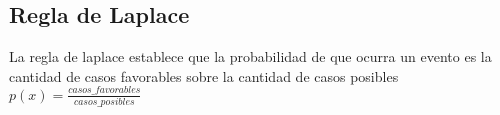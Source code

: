 \subsection{Regla de Laplace}
La regla de laplace establece que la probabilidad de que ocurra un evento es la cantidad de casos favorables sobre la cantidad de casos posibles\\
$p(x)=\frac{casos\_favorables}{casos\_posibles}$
